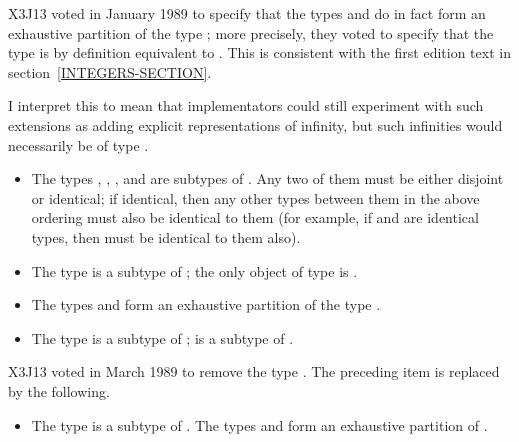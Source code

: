 \begin{new}
X3J13 voted in January 1989
to specify that the types  and 
do in fact form an exhaustive partition of the type ; more precisely,
they voted to specify that the type  is by definition equivalent
to .  This is consistent with the
first edition text in section~\ref{INTEGERS-SECTION}.

I interpret this to mean that implementators could still experiment with
such extensions as adding explicit representations of infinity, but such infinities
would necessarily be of type .
\end{new}

\begin{itemize}
\item
The types , , , and
 are subtypes of .  Any two of them must be
either disjoint or identical; if identical, then any other types between
them in the above ordering must also be identical to them
(for example, if  and  are identical types,
then  must be identical to them also).

\item
The type  is a subtype of ; the only object of type
 is {\nil}.

\item
The types  and  form an exhaustive partition of the type
.
\end{itemize}

\begin{obsolete}
\begin{itemize}
\item
The type  is a subtype of ;
 is a subtype of .
\end{itemize}
\end{obsolete}


\begin{newer}
X3J13 voted in March 1989  to remove the type .
The preceding item is replaced by the following.
\begin{itemize}
\item
The type  is a subtype of .
The types  and 
form an exhaustive partition of .
\end{itemize}
\end{newer}

